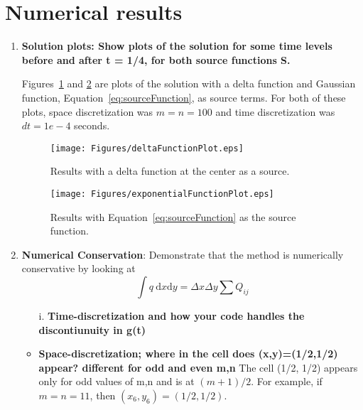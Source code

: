 
\section{Numerical results} %
\label{sec:numerical_results}

\begin{enumerate}
	\item \textbf{Solution plots: Show plots of the solution for some time levels before and after t = 1/4, for \textbf{both} source functions S.} 
	
	Figures~\ref{fig:Figures_deltaFunctionPlot} and \ref{fig:Figures_exponentialFunctionPlot} are plots of the solution with a delta function and Gaussian function, Equation~\eqref{eq:sourceFunction},  as source terms. For both of these plots, space discretization was $m=n=100$ and time discretization was $dt=1e-4$ seconds.
	\begin{figure}[htbp]
		\centering
			\texttt{[image: Figures/deltaFunctionPlot.eps]}
		\caption{Results with a delta function at the center as a source.}
		\label{fig:Figures_deltaFunctionPlot}
	\end{figure} %
	\begin{figure}[htbp]
		\centering
			\texttt{[image: Figures/exponentialFunctionPlot.eps]}
		\caption{Results with Equation~\eqref{eq:sourceFunction} as the source function.}
		\label{fig:Figures_exponentialFunctionPlot}
	\end{figure} %
	\item \textbf{Numerical Conservation}: Demonstrate that the method is numerically conservative by looking at 
	\begin{equation}
		\int q \mathrm{~d}x \mathrm{d}y = \Delta x \Delta y \sum Q_{ij}
		\label{eq:numConservation}
	\end{equation} %
	\begin{itemize}
		\item[i.] \textbf{Time-discretization and how your code handles the discontiunuity in g(t)}
		\item \textbf{Space-discretization; where in the cell does (x,y)=(1/2,1/2) appear? different for odd and even m,n}
		The cell (1/2, 1/2) appears only for odd values of m,n and is at $(m+1)/2$.  For example, if $m=n=11$, then $(x_{6},y_{6}) = (1/2,1/2)$.
	\end{itemize}
\end{enumerate}
